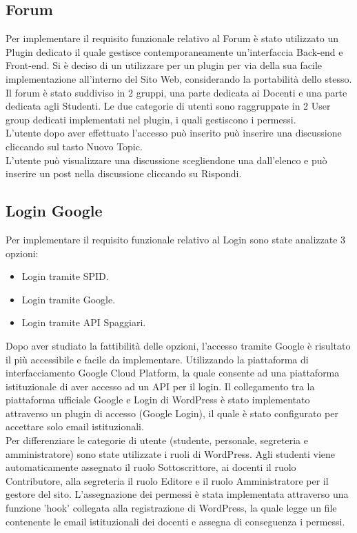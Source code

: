 \documentclass{article}
\begin{document}
	\subsection{\textbf{Forum}}

	Per implementare il requisito funzionale relativo al Forum è stato utilizzato un Plugin dedicato il quale gestisce contemporaneamente un'interfaccia Back-end e Front-end. Si è deciso di un utilizzare per un plugin per via della sua facile implementazione all'interno del Sito Web, considerando la portabilità dello stesso.\\
	Il forum è stato suddiviso in 2 gruppi, una parte dedicata ai Docenti e una parte dedicata agli Studenti. Le due categorie di utenti sono raggruppate in 2 User group dedicati implementati nel plugin, i quali gestiscono i permessi.\\
	L'utente dopo aver effettuato l'accesso può inserito può inserire una discussione cliccando sul tasto Nuovo Topic.\\
	L'utente può visualizzare una discussione scegliendone una dall'elenco e può inserire un post nella discussione cliccando su Rispondi.\\
	\subsection{\textbf{Login Google}}

	Per implementare il requisito funzionale relativo al Login sono state analizzate 3 opzioni:
	\begin{itemize}
	    \item Login tramite SPID.
	    \item Login tramite Google.
	    \item Login tramite API Spaggiari.
	\end{itemize}
	Dopo aver studiato la fattibilità delle opzioni, l'accesso tramite Google è risultato il più accessibile e facile da implementare. Utilizzando la piattaforma di interfacciamento Google Cloud Platform, la quale consente ad una piattaforma istituzionale di aver accesso ad un API per il login. Il collegamento tra la piattaforma ufficiale Google e Login di WordPress è stato implementato attraverso un plugin di accesso (Google Login), il quale è stato configurato per accettare solo email istituzionali.\\
	Per differenziare le categorie di utente (studente, personale, segreteria e amministratore) sono state utilizzate i ruoli di WordPress. Agli studenti viene automaticamente assegnato il ruolo Sottoscrittore, ai docenti il ruolo Contributore, alla segreteria il ruolo Editore e il ruolo Amministratore per il gestore del sito. L'assegnazione dei permessi è stata implementata attraverso una funzione 'hook' collegata alla registrazione di WordPress, la quale legge un file contenente le email istituzionali dei docenti e assegna di conseguenza i permessi.\\   
	
\end{document}
